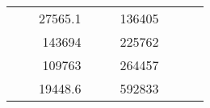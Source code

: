\begin{table}[H]
\begin{tabular}{|ccrccrccc}
\multicolumn{1}{|c|}{\cellcolor[HTML]{FFFFC7}}                                & \multicolumn{1}{c|}{\cellcolor[HTML]{DDFDFF}}                      & \multicolumn{1}{r|}{\cellcolor[HTML]{DAE8FC}27565.1}   & \multicolumn{1}{c|}{\cellcolor[HTML]{FFFFC7}}                                & \multicolumn{1}{c|}{\cellcolor[HTML]{DDFDFF}}                       & \multicolumn{1}{r|}{\cellcolor[HTML]{DDFDFF}136405}    &                                                                              &                                                                    &                                                        \\ \cline{3-3} \cline{6-6}
\multicolumn{1}{|c|}{\cellcolor[HTML]{FFFFC7}}                                & \multicolumn{1}{c|}{\cellcolor[HTML]{DDFDFF}}                      & \multicolumn{1}{r|}{\cellcolor[HTML]{DDFDFF}143694}    & \multicolumn{1}{c|}{\cellcolor[HTML]{FFFFC7}}                                & \multicolumn{1}{c|}{\cellcolor[HTML]{DDFDFF}}                       & \multicolumn{1}{r|}{\cellcolor[HTML]{DAE8FC}225762}    &                                                                              &                                                                    &                                                        \\ \cline{3-3} \cline{6-6}
\multicolumn{1}{|c|}{\cellcolor[HTML]{FFFFC7}}                                & \multicolumn{1}{c|}{\cellcolor[HTML]{DDFDFF}}                      & \multicolumn{1}{r|}{\cellcolor[HTML]{DAE8FC}109763}    & \multicolumn{1}{c|}{\cellcolor[HTML]{FFFFC7}}                                & \multicolumn{1}{c|}{\cellcolor[HTML]{DDFDFF}}                       & \multicolumn{1}{r|}{\cellcolor[HTML]{DDFDFF}264457}    &                                                                              &                                                                    &                                                        \\ \cline{3-3} \cline{6-6}
\multicolumn{1}{|c|}{\cellcolor[HTML]{FFFFC7}}                                & \multicolumn{1}{c|}{\cellcolor[HTML]{DDFDFF}}                      & \multicolumn{1}{r|}{\cellcolor[HTML]{DDFDFF}19448.6}   & \multicolumn{1}{c|}{\cellcolor[HTML]{FFFFC7}}                                & \multicolumn{1}{c|}{\cellcolor[HTML]{DDFDFF}}                       & \multicolumn{1}{r|}{\cellcolor[HTML]{DAE8FC}592833}    &                                                                              &                                                                    &                                                        \\ \cline{3-3} \cline{6-6}

\end{tabular}
\end{table}
